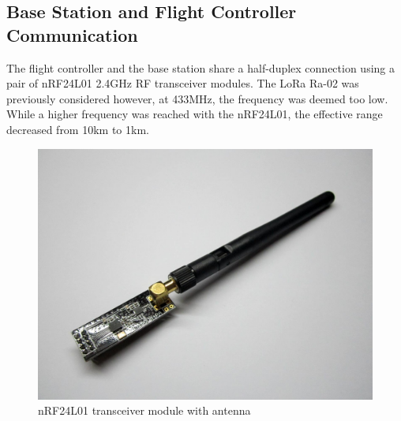 \documentclass[english]{upeeei}
\begin{document}
\subsection{Base Station and Flight Controller Communication}
The flight controller and the base station share a half-duplex connection using a pair of nRF24L01 2.4GHz RF transceiver modules\cite{EDWNrf24}. The LoRa Ra-02
was previously considered however, at 433MHz, the frequency was deemed too low. While a higher frequency was reached with the nRF24L01, the
effective range decreased from 10km to 1km. 
\begin{figure}[h]
    \centering
    \includegraphics[scale=0.3]{images/nrf24.jpg}
    \caption{nRF24L01 transceiver module with antenna\cite{EDWNrf24}}
    \label{fig:nrf24}
\end{figure}
\end{document}
